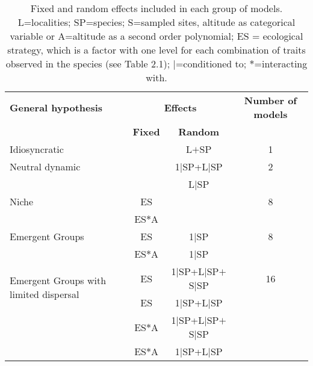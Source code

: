 \documentclass[12pt]{article}
\begin{document}
\begin{table}[!ht]
  \caption{Fixed and random effects included in
each group of models. L=localities; SP=species; S=sampled sites, altitude as categorical variable or A=altitude as a second order polynomial; ES = ecological strategy, which is a factor with one level for each combination of traits observed in the species (see Table 2.1); {$|$}=conditioned to; {$*$}=interacting with.}\label{mod}
 \begin{center}
 
 \begin{tabular}{p{4cm}ccc}
 
\hline \bf General hypothesis	& \multicolumn{2}{c}{\bf{Effects}}	& {\bf Number of models} \\ 
	&		 \bf Fixed	&	\bf  Random	  & \\ \hline
\multirow{1}{4cm}{{\color{gray}{$\blacksquare$}} Idiosyncratic }	&		&	L{$+$}SP 	& 1 \\ %
\multirow{1}{4cm}{{\color{neutral}{$\blacksquare$}} Neutral dynamic }&		& 1{$|$}SP+L{$|$}SP & 2	\\ 
&   & L{$|$}SP & \\ %
\multirow{1}{4cm}{{\color{niche}{$\blacksquare$}} Niche	}&	ES	&	&  8	\\
	&	ES{$*$}A &		& \\ %
\multirow{1}{4cm}{{\color{nineu}{$\blacksquare$}} Emergent Groups	} & ES	&	1{$|$}SP & 8	\\
	&	ES{$*$}A	&	1{$|$}SP &	\\ %
\multirow{2}{4cm}{{\color{nineu}{$\blacksquare$}} Emergent Groups with limited dispersal}& ES & 1{$|$}SP+L{$|$}SP{$+$}S{$|$}SP & 16\\ 
& ES & 1{$|$}SP+L{$|$}SP & \\ 
&  ES{$*$}A & 1{$|$}SP+L{$|$}SP{$+$}S{$|$}SP & \\ 
 & ES{$*$}A & 1{$|$}SP+L{$|$}SP & \\ 
\hline
\end{tabular}
\end{center}
\end{table}
\end{document}
